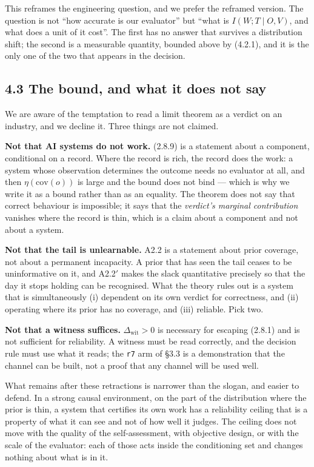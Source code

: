 \documentclass[11pt,a4paper]{article}
\begin{document}
This reframes the engineering question, and we prefer the reframed version. The
question is not ``how accurate is our evaluator'' but ``what is
\(I(W;T\mid O,V)\), and what does a unit of it cost''. The first has no answer that
survives a distribution shift; the second is a measurable quantity, bounded above
by (4.2.1), and it is the only one of the two that appears in the decision.

\subsection{4.3 The bound, and what it does not say}\label{the-bound-and-what-it-does-not-say}

We are aware of the temptation to read a limit theorem as a verdict on an
industry, and we decline it. Three things are not claimed.

\textbf{Not that AI systems do not work.} (2.8.9) is a statement about a component,
conditional on a record. Where the record is rich, the record does the work: a
system whose observation determines the outcome needs no evaluator at all, and then
\(\eta(\mathrm{cov}(o))\) is large and the bound does not bind --- which is why we
write it as a bound rather than as an equality. The theorem does not say that
correct behaviour is impossible; it says that the \emph{verdict's marginal contribution}
vanishes where the record is thin, which is a claim about a component and not about
a system.

\textbf{Not that the tail is unlearnable.} A2.2 is a statement about prior coverage, not
about a permanent incapacity. A prior that has seen the tail ceases to be
uninformative on it, and A2.2\('\) makes the slack quantitative precisely so that the
day it stops holding can be recognised. What the theory rules out is a system
that is simultaneously (i) dependent on its own verdict for correctness, and
(ii) operating where its prior has no coverage, and (iii) reliable. Pick two.

\textbf{Not that a witness suffices.} \(\Delta_{\mathrm{wit}}>0\) is necessary for
escaping (2.8.1) and is not sufficient for reliability. A witness must be read
correctly, and the decision rule must use what it reads; the \texttt{r7} arm of §3.3 is a
demonstration that the channel can be built, not a proof that any channel will be
used well.

What remains after these retractions is narrower than the slogan, and easier to
defend. In a strong causal environment, on the part of the distribution where the
prior is thin, a system that certifies its own work has a reliability ceiling that
is a property of what it can see and not of how well it judges. The ceiling does
not move with the quality of the self-assessment, with objective design, or with
the scale of the evaluator: each of those acts inside the conditioning set and
changes nothing about what is in it.
\end{document}
